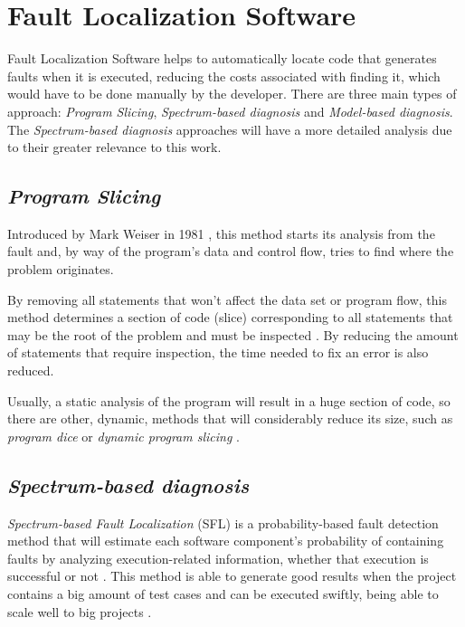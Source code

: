 \section{Fault Localization Software}

Fault Localization Software helps to automatically locate code that generates faults when it is executed, reducing the costs associated with finding it, which would have to be done manually by the developer.  There are three main types of approach: \emph{Program Slicing}, \emph{Spectrum-based diagnosis} and \emph{Model-based diagnosis}. The \emph{Spectrum-based diagnosis} approaches will have a more detailed analysis due to their greater relevance to this work.

\nocite{Wong2016}

%
%

\subsection{\emph{Program Slicing}}

Introduced by Mark Weiser in 1981 \cite{Weiser1981, Weiser1982}, this method starts its analysis from the fault and, by way of the program's data and control flow, tries to find where the problem originates.

By removing all statements that won't affect the data set or program flow, this method determines a section of code (slice) corresponding to all statements that may be the root of the problem and must be inspected \cite{Perez2004}. By reducing the amount of statements that require inspection, the time needed to fix an error is also reduced.

Usually, a static analysis of the program will result in a huge section of code, so there are other, dynamic, methods that will considerably reduce its size, such as \emph{program dice} or \emph{dynamic program slicing} \cite{Perez2004}.

%
%

\subsection{\emph{Spectrum-based diagnosis}}

\emph{Spectrum-based Fault Localization} (SFL) is a probability-based fault detection method that will estimate each software component's probability of containing faults by analyzing execution-related information, whether that execution is successful or not \cite{Abreu2007}. This method is able to generate good results when the project contains a big amount of test cases and can be executed swiftly, being able to scale well to big projects \cite{Mayer2008}.


